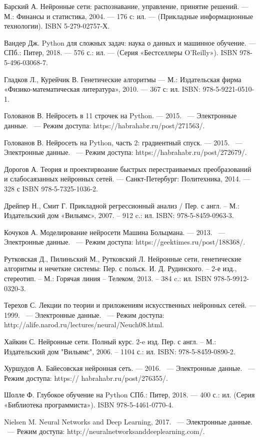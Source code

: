 \newpage

\begin{thebibliography}{99}

   Барский А. Нейронные сети: распознавание, управление, принятие решений. — М.: Финансы и статистика, 2004. — 176 с: ил. — (Прикладные информационные технологии). ISBN 5-279-02757-Х.

   Вандер Дж. Python для сложных задач: наука о данных и машинное обучение. — СПб.: Питер, 2018. — 576 с.: ил. — (Серия «Бестселлеры O’Reilly»). ISBN 978-5-496-03068-7. 

   Гладков Л., Курейчик В. Генетические алгоритмы — М.: Издательская фирма «Физико-математическая литература», 2010. — 367 с: ил. ISBN: 978-5-9221-0510-1.

   Голованов В. Нейросеть в 11 строчек на Python. — 2015. ~--- Электронные данные. ~--- Режим доступа: https://habrahabr.ru/post/271563/.

   Голованов В. Нейросеть на Python, часть 2: градиентный спуск. — 2015. ~--- Электронные данные. ~--- Режим доступа: https://habrahabr.ru/post/272679/.

   Дорогов А. Теория и проектирвоание быстрых перестраиваемых преобразований и слабосаязанных нейронных сетей. — Санкт-Петербург: Политехника, 2014. — 328 с ISBN 978-5-7325-1036-2.

  	Дрейпер Н., Смит Г. Прикладной регрессионный анализ / Пер. с англ. – М.: Издательский дом «Вильямс», 2007. – 912 c.: ил. ISBN: 978-5-8459-0963-3.

   Кочуков А. Моделирование нейросети Машина Больцмана. — 2013. ~--- Электронные данные. ~--- Режим доступа:
  https://geektimes.ru/post/188368/.

   Рутковская Д., Пилиньский М., Рутковский Л. Нейронные сети, генетические алгоритмы и нечеткие системы: Пер. с польск.  И. Д. Рудинского. – 2-е изд., стереотип. –  М.: Горячая линия – Телеком, 2013. – 384 c.: ил. ISBN 978-5-9912-0320-3.

   Терехов С. Лекции по теории и приложениям искусственных
  нейронных сетей. — 1999. ~--- Электронные данные. ~--- Режим доступа: http://alife.narod.ru/lectures/neural/Neuch08.html.

   Хайкин С. Нейронные сети. Полный курс. 2-e изд. Пер. с англ. – М.: Издательский дом "Вильямс", 2006. – 1104 с.: ил. ISBN: 978-5-8459-0890-2.

   Хуршудов А. Байесовская нейронная сеть. — 2016. ~--- Электронные данные. ~--- Режим доступа: https://
  habrahabr.ru/post/276355/.

   Шолле Ф. Глубокое обучение на Python 
  СПб.: Питер, 2018. — 400 с.: ил. (Серия «Библиотека программиста»). ISBN 978-5-4461-0770-4.

   Nielsen M. Neural Networks and Deep Learning, 2017. ~--- Электронные данные. ~--- Режим доступа:  http://neuralnetworksanddeeplearning.com/.
  
\end{thebibliography}